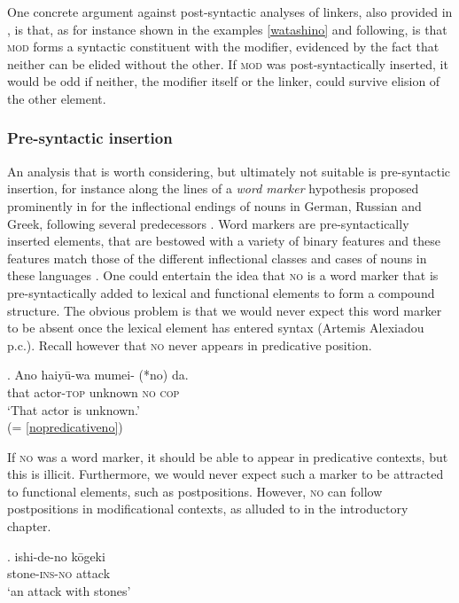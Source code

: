 \documentclass [output=book,colorlinks,citecolor=brown]{langscibook}
\begin{document}
One concrete argument against post-syntactic analyses of linkers, also provided in \citet[54–55]{philip:2012:linkers}, is that, as for instance shown in the examples \ref{watashino} and following, is that \textsc{mod} forms a syntactic constituent with the modifier, evidenced by the fact that neither can be elided without the other. If \textsc{mod} was post-syntactically inserted, it would be odd if neither, the modifier itself or the linker, could survive elision of the other element.

\subsubsection{Pre-syntactic insertion}

An analysis that is worth considering, but ultimately not suitable is pre-syntactic insertion, for instance along the lines of a \textit{word marker} hypothesis proposed prominently in \citet{alex:2008:class} for the inflectional endings of nouns in German, Russian and Greek, following several predecessors \citep{harris:1991:exponence, ritter:1993:where, aronoff:1996:morphology, oltra:1999:on, oltra:2005:stress} . Word markers are pre-syntactically inserted elements, that are bestowed with a variety of binary features and these features match those of the different inflectional classes and cases of nouns in these languages \citep[33]{alex:2008:class}. One could entertain the idea that \textsc{no} is a word marker that is pre-syntactically added to lexical and functional elements to form a compound structure. The obvious problem is that we would never expect this word marker to be absent once the lexical element has entered syntax (Artemis Alexiadou p.c.). Recall however that \textsc{no} never appears in predicative position. %

\exg. Ano haiyū-wa mumei- (*no) da.\\
that actor-\textsc{top} unknown \textsc{no} \textsc{cop}\\
`That actor is unknown.’ \\ \null \hfill (= \ref{nopredicativeno})

If \textsc{no} was a word marker, it should be able to appear in predicative contexts, but this is illicit. Furthermore, we would never expect such a marker to be attracted to functional elements, such as postpositions. However, \textsc{no} can follow postpositions in modificational contexts, as alluded to in the introductory chapter.

\exg. ishi-de-no kōgeki\\
stone-\textsc{ins-no} attack\\
`an attack with stones' \null \hfill \citep[248]{saito:2008:N}
\end{document}
